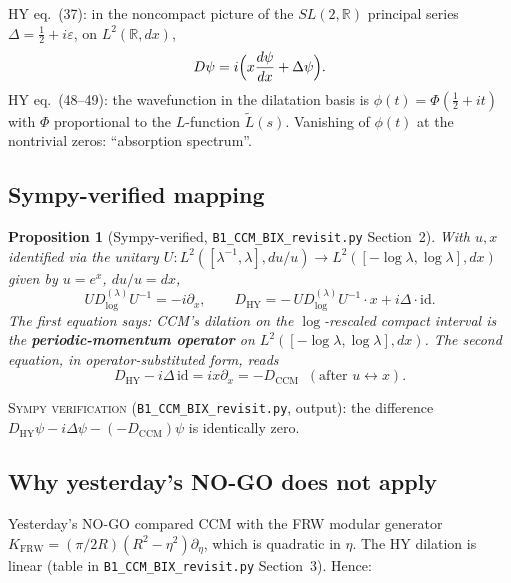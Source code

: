 \documentclass[11pt,a4paper]{article}
\newtheorem{proposition}[theorem]{Proposition}
\theoremstyle{definition}
\newcommand{\R}{\mathbb{R}}
\begin{document}
HY \cite{HartnollYang2025} eq.~(37): in the noncompact picture of the
$SL(2,\R)$ principal series $\Delta = \tfrac{1}{2} + i\varepsilon$,
on $L^2(\R, dx)$,
\begin{equation}
  D \psi = i\Bigl(x \frac{d \psi}{dx} + \Delta \psi\Bigr).
\end{equation}
HY eq.~(48--49): the wavefunction in the dilatation basis is
$\phi(t) = \Phi(\tfrac{1}{2} + it)$ with $\Phi$ proportional to the
$L$-function $\widetilde L(s)$. Vanishing of $\phi(t)$ at the
nontrivial zeros: ``absorption spectrum''.

\subsection{Sympy-verified mapping}

\begin{proposition}[Sympy-verified, \texttt{B1\_CCM\_BIX\_revisit.py}
Section~2]
With $u, x$ identified via the unitary
$U: L^2([\lambda^{-1}, \lambda], du/u) \to L^2([-\log \lambda, \log
\lambda], dx)$ given by $u = e^x$, $du/u = dx$,
\begin{equation}\label{eq:CCM-HY-mapping}
  U D^{(\lambda)}_{\log} U^{-1} = -i \partial_x,
  \qquad
  D_{\mathrm{HY}} = -\,U D^{(\lambda)}_{\log} U^{-1} \cdot x
   + i\Delta \cdot \mathrm{id}.
\end{equation}
The first equation says: CCM's dilation on the
$\log$-rescaled compact interval is the
\textbf{periodic-momentum operator} on $L^2([-\log \lambda, \log \lambda], dx)$.
The second equation, in operator-substituted form, reads
\begin{equation}
  D_{\mathrm{HY}} - i\Delta\,\mathrm{id} = i x \partial_x = -D_{\mathrm{CCM}}
  \;\;(\text{after } u \leftrightarrow x).
\end{equation}
\end{proposition}

\textsc{Sympy verification} (\texttt{B1\_CCM\_BIX\_revisit.py},
output): the difference $D_{\mathrm{HY}}\psi -
i\Delta\psi - (-D_{\mathrm{CCM}})\psi$ is identically zero.

\subsection{Why yesterday's NO-GO does not apply}

Yesterday's NO-GO \cite{CCMFRWbridge2026} compared CCM with the FRW
modular generator $K_{\mathrm{FRW}} = (\pi/2R)(R^2 - \eta^2)
\partial_\eta$, which is quadratic in $\eta$. The HY dilation is
linear (table in \texttt{B1\_CCM\_BIX\_revisit.py} Section~3). Hence:
\end{document}
